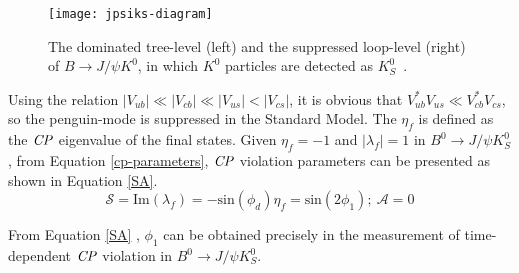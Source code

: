 \begin{figure}[htpb]
	\centering
	\texttt{[image: jpsiks-diagram]}
	\caption{The dominated tree-level (left) and the suppressed loop-level (right) of $B\to J/\psi K^0$, in which $K^0$ particles are detected as $K_S^0$~\cite{wishahi2014measurement}.}
	\label{fig:jpsiks}
\end{figure}


Using the relation $|V_{ub}|\ll |V_{cb}|\ll|V_{us}|<|V_{cs}|$, it is obvious that $V^*_{ub}V_{us} \ll V^*_{cb}V_{cs}$, so the penguin-mode is suppressed in the Standard Model. The $\eta_f$ is defined as the $\it{CP}$ eigenvalue of the final states. Given $\eta_f=-1$ and $|\lambda_f|=1$ in $B^0 \to J/\psi K^0_S$, from Equation \ref{cp-parameters}, $\it{CP}$ violation parameters can be presented as shown in Equation \ref{SA}.
\begin{equation}\label{SA}
\mathcal{S} = \text{Im}(\lambda_f)
=-\text{sin}(\phi_d)\eta_f=\text{sin}(2\phi_1) ; \: \mathcal{A} = 0
\end{equation}

From Equation \ref{SA} , $\phi_1$ can be obtained precisely in the measurement of time-dependent $\it{CP}$ violation in $B^0 \to J/\psi K^0_S$.
\begin{comment}
In the $b\to q\bar{q}s$ process where flavor $q$ is not charm, similar to the discussion above, we can extract $\phi_1$ using the same method. Moreover, it provides a penguin-dominated process which is sensitive to the contribution of New Physics, which includes the $B^0_d\to K^0_S K^0_S K^0_S$ decay. In the next section, it's clear that such decay process is important to provide additional insight in seeking the effect beyond the SM (BSM contribution).
\end{comment}



